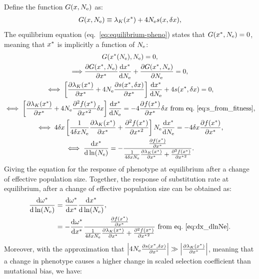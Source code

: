 Define the function $G(x, N_{\mathrm{e}} )$ as:
\begin{gather}
G(x, N_{\mathrm{e}} ) \equiv \lambda_K (x^{*}) + 4 N_{\mathrm{e}} s(x, \delta x),
\end{gather}
The equilibrium equation (eq.~\ref{eq:equilibrium-pheno}) states that $G(x^{*}, N_{\mathrm{e}} )=0$, meaning that $x^{*}$ is implicitly a function of $N_{\mathrm{e}}$:
\begin{gather}
G(x^{*}(N_{\mathrm{e}}), N_{\mathrm{e}} ) = 0, \\
\Longrightarrow \frac{\partial G(x^{*}, N_{\mathrm{e}} ) }{\partial x^{*} }\frac{ \mathrm{d} x^{*}}{\mathrm{d} N_{\mathrm{e}}} + \frac{ \partial G(x^{*}, N_{\mathrm{e}} )}{\partial N_{\mathrm{e}}} = 0, \\
\iff \left[  \frac{\partial \lambda_K (x^{*}) }{\partial x^{*} }  + 4 N_{\mathrm{e}} \frac{ \partial s(x^{*}, \delta x) }{\partial x^{*} } \right]\frac{ \mathrm{d} x^{*}}{\mathrm{d} N_{\mathrm{e}}} + 4 s(x^{*}, \delta x) = 0, \\
\iff \left[  \frac{\partial \lambda_K (x^{*}) }{\partial x^{*} } + 4 N_{\mathrm{e}} \frac{ \partial^2 f (x^{*}) }{\partial {x^{*}}^2}\delta x \right]\frac{ \mathrm{d} x^{*}}{\mathrm{d} N_{\mathrm{e}}}  = - 4 \frac{ \partial f (x^{*}) }{\partial {x^{*}}}\delta x \text{ from eq.~\ref{eq:s_from_fitness}}, \\
\iff 4 \delta x \left[ \frac{1}{4 \delta x N_{\mathrm{e}} } \frac{\partial \lambda_K (x^{*}) }{\partial x^{*} } + \frac{ \partial^2 f (x^{*}) }{\partial {x^{*}}^2} \right] N_{\mathrm{e}} \frac{ \mathrm{d} x^{*}}{\mathrm{d} N_{\mathrm{e}}}  = - 4 \delta x \frac{ \partial f (x^{*}) }{\partial {x^{*}}}, \\
\iff \frac{ \mathrm{d} x^{*}}{\mathrm{d} \ln (N_{\mathrm{e}})}  = - \frac{\frac{ \partial f (x^{*}) }{\partial {x^{*}}}}{\frac{1}{4 \delta x N_{\mathrm{e}}} \frac{\partial \lambda_K (x^{*}) }{\partial x^{*} } + \frac{ \partial^2 f (x^{*}) }{\partial {x^{*}}^2}}  \label{eq:dx_dlnNe}.
\end{gather}
Giving the equation for the response of phenotype at equilibrium after a change of effective population size.
Together, the response of substitution rate at equilibrium, after a change of effective population size can be obtained as:
\begin{align}
\frac{\mathrm{d} \omega^{*}}{\mathrm{d} \ln (N_{\mathrm{e}})} & = \frac{\mathrm{d} \omega^{*}}{\mathrm{d} x^{*}} \frac{ \mathrm{d} x^{*}}{\mathrm{d} \ln (N_{\mathrm{e}})}, \\
 &= - \frac{\mathrm{d} \omega^{*}}{\mathrm{d} x^{*}} \frac{\frac{ \partial f (x^{*}) }{\partial {x^{*}}}}{\frac{1}{4 \delta x N_{\mathrm{e}} } \frac{\partial \lambda_K (x^{*}) }{\partial x^{*} } + \frac{ \partial^2 f (x^{*}) }{\partial {x^{*}}^2}} \text{ from eq.~\ref{eq:dx_dlnNe}} \label{eq:dw_dlnNe}.
\end{align}
Moreover, with the approximation that $\left| 4 N_{\mathrm{e}} \frac{ \partial s(x^{*}, \delta x) }{\partial x^{*} } \right| \gg \left| \frac{\partial \lambda_K (x^{*}) }{\partial x^{*} } \right|$, meaning that a change in phenotype causes a higher change in scaled selection coefficient than mutational bias, we have:

